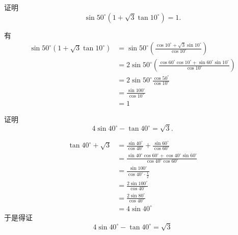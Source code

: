 \begin{questions}
    \question 证明
    \[
    \sin 50^\circ (1 + \sqrt{3} \tan 10^\circ)=1.
    \]
    \begin{solution}
        有
        \begin{align*}
        \sin 50^\circ (1 + \sqrt{3} \tan 10^\circ) &= \sin 50^\circ \left(\frac{\cos 10^\circ+\sqrt{3} \sin 10^\circ}{\cos 10^\circ}\right) \\
        &= 2 \sin 50^\circ \left(\frac{\cos 60^\circ \cos 10^\circ + \sin 60^\circ \sin 10^\circ}{\cos 10^\circ}\right) \\
        &= 2 \sin 50^\circ \frac{\cos 50^\circ}{\cos 10^\circ} \\
        &= \frac{\sin 100^\circ}{\cos 10^\circ} \\
        &= 1
        \end{align*}
    \end{solution}

    \question 证明
    \[
    4 \sin 40^{\circ} - \tan 40^{\circ} = \sqrt{3}.
    \]
    \begin{solution}
        \begin{align*}
        \tan 40^{\circ} + \sqrt{3} 
        & = \frac{\sin 40^{\circ}}{\cos 40^{\circ}} + \frac{\sin 60^{\circ}}{\cos 60^{\circ}} \\
        & = \frac{\sin 40^{\circ} \cos 60^{\circ} + \cos 40^{\circ} \sin 60^{\circ}}{\cos 40^{\circ} \cos 60^{\circ}} \\
        & = \frac{\sin 100^{\circ}}{\cos 40^{\circ} \cdot \frac{1}{2}} \\
        & = \frac{2 \sin 100^{\circ}}{\cos 40^{\circ}} \\
        & = \frac{2 \sin 80^{\circ}}{\cos 40^{\circ}} \\
        & = 4 \sin 40^{\circ} 
        \end{align*}
        于是得证
        \[
        4 \sin 40^{\circ} - \tan 40^{\circ} = \sqrt{3}
        \]
    \end{solution}
    

\end{questions}
